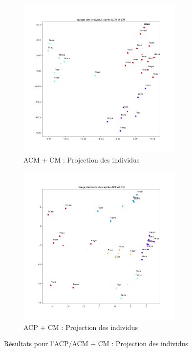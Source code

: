 \begin{figure}[!htb]
        \begin{subfigure}[b]{0.45\textwidth}
            \centering
            \includegraphics[width=0.9\textwidth]{img/Individus_ACM-CM.png}
            \caption{ACM + CM : Projection des individus}
            \label{Label_Individus_ACM-CM.png}
        \end{subfigure}
        \begin{subfigure}[b]{0.45\textwidth}
            \centering
            \includegraphics[width=0.9\textwidth]{img/Individus_ACP-CM.png}
            \caption{ACP + CM : Projection des individus}
            \label{Label_Individus_ACP-CM.png}
        \end{subfigure}
        \caption{Résultats pour l'ACP/ACM + CM : Projection des individus}
        \label{Label_Individus_ACP_ACM-CM.png}
    \end{figure}
    
